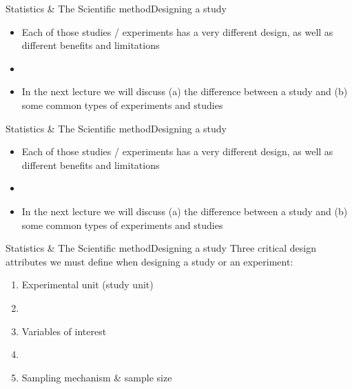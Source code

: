\documentclass[xcolor=dvipsnames]{beamer}
\begin{document}
\begin{frame}{Statistics \& The Scientific method}{Designing a study}
	\vspace{-12pt}
	\begin{itemize}
		\item Each of those studies / experiments has a very different design, as well as different benefits and limitations 
		\item[] 
		\item In the next lecture we will discuss (a) the difference between a study and (b) some common types of experiments and studies
	\end{itemize}
\end{frame}

\begin{frame}{Statistics \& The Scientific method}{Designing a study}
	\vspace{-12pt}
	\begin{itemize}
		\item Each of those studies / experiments has a very different design, as well as different benefits and limitations 
		\item[] 
		\item In the next lecture we will discuss (a) the difference between a study and (b) some common types of experiments and studies
	\end{itemize}
\end{frame}

\begin{frame}{Statistics \& The Scientific method}{Designing a study}
	\vspace{-12pt}
	Three critical design attributes we must define when designing a study or an experiment:
	\begin{enumerate}
		\item Experimental unit (study unit)
		\item[]
		\item Variables of interest
		\item[]
		\item Sampling mechanism \& sample size
	\end{enumerate}
\end{frame}
\end{document}
